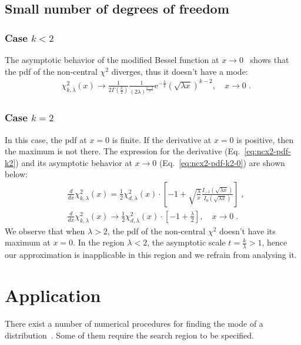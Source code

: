 \documentclass{amsart}
\numberwithin{equation}{section}
\begin{document}
\subsection{Small number of degrees of freedom}\label{subsec:edge-cases}
%
\subsubsection{Case $k < 2$}
The asymptotic behavior of the modified Bessel function at $x \rightarrow 0$~\cite[Eq.~10.30.1]{NIST:DLMF} shows that the pdf of the non-central $\chi^2$ diverges, thus it doesn't have a mode:
%
\begin{align}
 &\chi^2_{k, \lambda}(x) \rightarrow \frac{1}{2\Gamma(\frac{k}{2})} \frac{1}{(2 \lambda)^{\frac{k - 2}{2}}} \mathrm{e}^{-\frac{\lambda}{2}} \left(\sqrt{\lambda x}\right)^{k-2}, \quad x \rightarrow 0\;.
\end{align}
%
\subsubsection{Case $k = 2$}
In this case, the pdf at $x=0$ is finite. If the derivative at $x=0$ is positive, then the maximum is not there. The expression for the derivative (Eq.~\ref{eq:ncx2-pdf-k2}) and its asymptotic behavior at $x \rightarrow 0$ (Eq.~\ref{eq:ncx2-pdf-k2-0}) are shown below:
%
\begin{align}
 &\frac{d}{dx} \chi^2_{k, \lambda}(x) = \frac{1}{2} \chi^2_{d, \lambda}(x) \cdot \left[ -1 +  \sqrt{\frac{\lambda}{x}}\frac{I_{-1}(\sqrt{\lambda x})}{I_{0}(\sqrt{\lambda x})} \right]\label{eq:ncx2-pdf-k2}\;, \\
 &\frac{d}{dx} \chi^2_{k, \lambda}(x) \rightarrow \frac{1}{2} \chi^2_{d, \lambda}(x) \cdot \left[ -1 + \frac{\lambda}{2} \right], \quad x \rightarrow 0\label{eq:ncx2-pdf-k2-0}\;.
\end{align}
%
We observe that when $\lambda > 2$, the pdf of the non-central $\chi^2$ doesn't have its maximum at $x = 0$. In the region $\lambda < 2$, the asymptotic scale $t = \frac{k}{\lambda} > 1$, hence our approximation is inapplicable in this region and we refrain from analysing it.

\section{Application}
There exist a number of numerical procedures for finding the mode of a distribution~\cite[Ch.~10]{NR}. Some of them require the search region to be specified.
\end{document}
